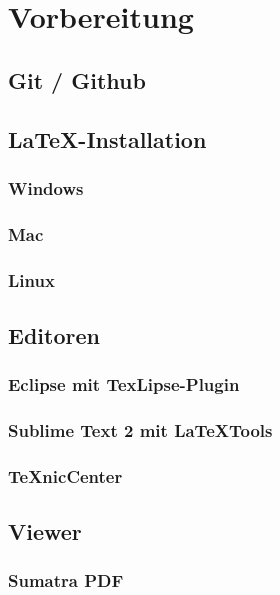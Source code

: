 \section{Vorbereitung}

\subsection{Git / Github}

\subsection{\LaTeX-Installation}
\subsubsection{Windows}
\subsubsection{Mac}
\subsubsection{Linux}

\subsection{Editoren}
\subsubsection{Eclipse mit TexLipse-Plugin}
\subsubsection{Sublime Text 2 mit LaTeXTools}
\subsubsection{TeXnicCenter}

\subsection{Viewer}
\subsubsection{Sumatra PDF}

